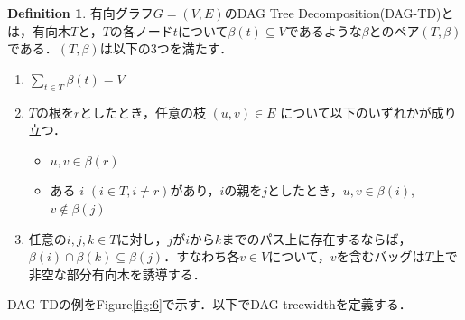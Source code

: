 \documentclass[master]{kuisthesis}		%
\theoremstyle{plain}
\theoremstyle{definition}
\newtheorem{definition*}{Definition}
\begin{document}
\begin{definition*}
 有向グラフ$G=(V, E)$のDAG Tree Decomposition(DAG-TD)とは，有向木$T$と，$T$の各ノード$t$について$\beta(t) \subseteq V$であるような$\beta$とのペア$(T, \beta)$である．$(T, \beta)$は以下の3つを満たす．
 
\begin{enumerate}
    \item $\sum_{t\in T} \beta(t) = V$ 
    \item $T$の根を$r$としたとき，任意の枝 $ (u, v) \in E $ について以下のいずれかが成り立つ．
    \begin{itemize}
          \item $u, v \in \beta(r)$
          \item ある $i$ $(i \in T, i \neq r)$があり，$i$の親を$j$としたとき，$u, v \in \beta(i)$, $v \notin \beta(j)$
    \end{itemize}
    \item 任意の$ i, j, k \in T$に対し，$j$が$i$から$k$までのパス上に存在するならば，$\beta(i) \cap \beta(k) \subseteq \beta(j)$．すなわち各$v \in V$について，$v$を含むバッグは$T$上で非空な部分有向木を誘導する．
    \end{enumerate}
\end{definition*}



DAG-TDの例をFigure\ref{fig:6}で示す．以下でDAG-treewidthを定義する．
\end{document}
